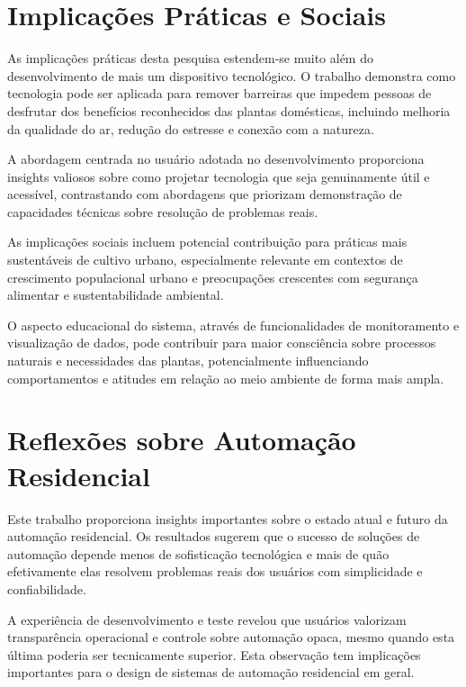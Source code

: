 \section{Implicações Práticas e Sociais}

As implicações práticas desta pesquisa estendem-se muito além do desenvolvimento de mais um dispositivo tecnológico. O trabalho demonstra como tecnologia pode ser aplicada para remover barreiras que impedem pessoas de desfrutar dos benefícios reconhecidos das plantas domésticas, incluindo melhoria da qualidade do ar, redução do estresse e conexão com a natureza.

A abordagem centrada no usuário adotada no desenvolvimento proporciona insights valiosos sobre como projetar tecnologia que seja genuinamente útil e acessível, contrastando com abordagens que priorizam demonstração de capacidades técnicas sobre resolução de problemas reais.


As implicações sociais incluem potencial contribuição para práticas mais sustentáveis de cultivo urbano, especialmente relevante em contextos de crescimento populacional urbano e preocupações crescentes com segurança alimentar e sustentabilidade ambiental.

O aspecto educacional do sistema, através de funcionalidades de monitoramento e visualização de dados, pode contribuir para maior consciência sobre processos naturais e necessidades das plantas, potencialmente influenciando comportamentos e atitudes em relação ao meio ambiente de forma mais ampla.

\section{Reflexões sobre Automação Residencial}

Este trabalho proporciona insights importantes sobre o estado atual e futuro da automação residencial. Os resultados sugerem que o sucesso de soluções de automação depende menos de sofisticação tecnológica e mais de quão efetivamente elas resolvem problemas reais dos usuários com simplicidade e confiabilidade.

A experiência de desenvolvimento e teste revelou que usuários valorizam transparência operacional e controle sobre automação opaca, mesmo quando esta última poderia ser tecnicamente superior. Esta observação tem implicações importantes para o design de sistemas de automação residencial em geral.

